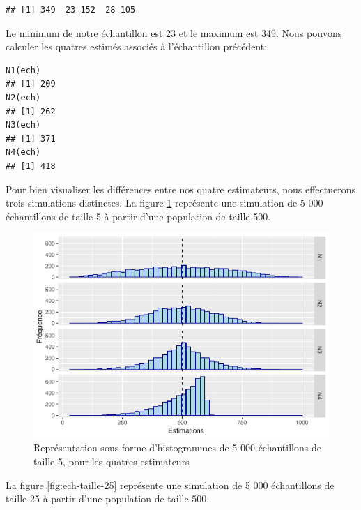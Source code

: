 \documentclass[10pt]{article}
\begin{document}
\begin{verbatim}
## [1] 349  23 152  28 105
\end{verbatim}

Le minimum de notre échantillon est 23 et le maximum est 349. Nous
pouvons calculer les quatres estimés associés à l'échantillon précédent:

\begin{verbatim}
N1(ech)
## [1] 209
N2(ech)
## [1] 262
N3(ech)
## [1] 371
N4(ech)
## [1] 418
\end{verbatim}

Pour bien visualiser les différences entre nos quatre estimateurs, nous
effectuerons trois simulations distinctes. La figure
\ref{fig:ech-taille-5} représente une simulation de 5 000 échantillons
de taille 5 à partir d'une population de taille 500.

\begin{figure}

{\centering \includegraphics[width=0.9\linewidth]{serial_number_amq_files/figure-latex/ech-taille-5-1} 

}

\caption{Représentation sous forme d'histogrammes de 5 000 échantillons de taille 5, pour les quatres estimateurs}\label{fig:ech-taille-5}
\end{figure}

La figure \ref{fig:ech-taille-25} représente une simulation de 5 000
échantillons de taille 25 à partir d'une population de taille 500.
\end{document}
